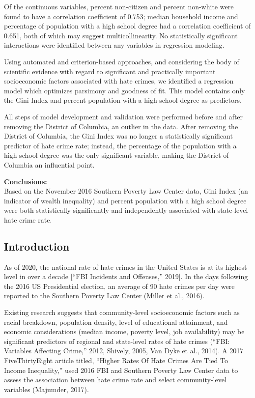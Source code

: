 \documentclass[
]{article}
\begin{document}
Of the continuous variables, percent non-citizen and percent non-white
were found to have a correlation coefficient of 0.753; median household
income and percentage of population with a high school degree had a
correlation coefficient of 0.651, both of which may suggest
multicollinearity. No statistically significant interactions were
identified between any variables in regression modeling.

Using automated and criterion-based approaches, and considering the body
of scientific evidence with regard to significant and practically
important socioeconomic factors associated with hate crimes, we
identified a regression model which optimizes parsimony and goodness of
fit. This model contains only the Gini Index and percent population with
a high school degree as predictors.

All steps of model development and validation were performed before and
after removing the District of Columbia, an outlier in the data. After
removing the District of Columbia, the Gini Index was no longer a
statistically significant predictor of hate crime rate; instead, the
percentage of the population with a high school degree was the only
significant variable, making the District of Columbia an influential
point.

\textbf{Conclusions:}\\
Based on the November 2016 Southern Poverty Law Center data, Gini Index
(an indicator of wealth inequality) and percent population with a high
school degree were both statistically significantly and independently
associated with state-level hate crime rate.

\hypertarget{introduction}{%
\subsection{Introduction}\label{introduction}}

As of 2020, the national rate of hate crimes in the United States is at
its highest level in over a decade {[}``FBI Incidents and Offenses,''
2019{]}. In the days following the 2016 US Presidential election, an
average of 90 hate crimes per day were reported to the Southern Poverty
Law Center (Miller et al., 2016).

Existing research suggests that community-level socioeconomic factors
such as racial breakdown, population density, level of educational
attainment, and economic considerations (median income, poverty level,
job availability) may be significant predictors of regional and
state-level rates of hate crimes (``FBI: Variables Affecting Crime,''
2012, Shively, 2005, Van Dyke et al., 2014). A 2017 FiveThirtyEight
article titled, ``Higher Rates Of Hate Crimes Are Tied To Income
Inequality,'' used 2016 FBI and Southern Poverty Law Center data to
assess the association between hate crime rate and select
community-level variables (Majumder, 2017).
\end{document}

